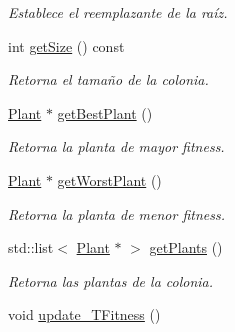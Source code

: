 \begin{DoxyCompactItemize}
\begin{DoxyCompactList}\small\item\em Establece el reemplazante de la raíz. \end{DoxyCompactList}\item 
int \hyperlink{class_colony_a9f647ee71e990d77daeb95a72d2251ec}{get\+Size} () const 
\begin{DoxyCompactList}\small\item\em Retorna el tamaño de la colonia. \end{DoxyCompactList}\item 
\hyperlink{class_plant}{Plant} $\ast$ \hyperlink{class_colony_a686417d078d3544d7c07309822a8c45e}{get\+Best\+Plant} ()
\begin{DoxyCompactList}\small\item\em Retorna la planta de mayor fitness. \end{DoxyCompactList}\item 
\hyperlink{class_plant}{Plant} $\ast$ \hyperlink{class_colony_a858397bdf56c10bdc8035f907b0d227e}{get\+Worst\+Plant} ()
\begin{DoxyCompactList}\small\item\em Retorna la planta de menor fitness. \end{DoxyCompactList}\item 
std\+::list$<$ \hyperlink{class_plant}{Plant} $\ast$ $>$ \hyperlink{class_colony_a349e5b625a4f62dd55a3911319051df7}{get\+Plants} ()
\begin{DoxyCompactList}\small\item\em Retorna las plantas de la colonia. \end{DoxyCompactList}\item 
\hypertarget{class_colony_a768a1fa3225bce6b7c28031d0efac929}{void \hyperlink{class_colony_a768a1fa3225bce6b7c28031d0efac929}{update\+\_\+\+T\+Fitness} ()}\label{class_colony_a768a1fa3225bce6b7c28031d0efac929}


\end{DoxyCompactItemize}

